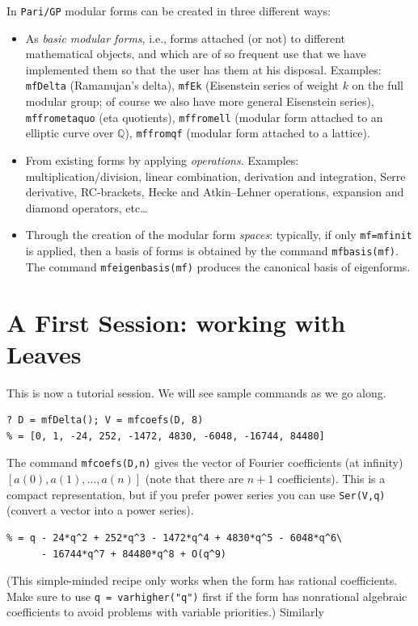 \documentclass[11pt]{article}
\newcommand{\Q}{{\mathbb Q}}
\def\kbd#1{{\tt #1}}
\begin{document}
In \kbd{Pari/GP} modular forms can be created in three different ways:

\begin{itemize}\item As \emph{basic modular forms}, i.e., forms attached (or
  not) to different mathematical objects, and which are of so frequent use
  that we have implemented them so that the user has them at his disposal.
  Examples: \kbd{mfDelta} (Ramanujan's delta), \kbd{mfEk}
  (Eisenstein series of weight $k$ on the full modular group; of course
  we also have more general Eisenstein series), \kbd{mffrometaquo}
  (eta quotients), \kbd{mffromell} (modular form attached to an elliptic
  curve over $\Q$), \kbd{mffromqf} (modular form attached
  to a lattice).
\item From existing forms by applying \emph{operations}.
  Examples: multiplication/division, linear combination,
  derivation and integration, Serre derivative, RC-brackets, Hecke and
  Atkin--Lehner operations, expansion and diamond operators, etc\dots
\item Through the creation of the modular form \emph{spaces}:
  typically, if only \kbd{mf=mfinit} is applied, then a
  basis of forms is obtained by the command \kbd{mfbasis(mf)}.
  The command \kbd{mfeigenbasis(mf)} produces the canonical basis of
  eigenforms.\end{itemize}

\section{A First Session: working with Leaves}

This is now a tutorial session. We will see sample commands as we go along.

\begin{verbatim}
? D = mfDelta(); V = mfcoefs(D, 8)
% = [0, 1, -24, 252, -1472, 4830, -6048, -16744, 84480]
\end{verbatim}

The command \kbd{mfcoefs(D,n)} gives the vector of Fourier coefficients (at
infinity) $[a(0),a(1),\dots,a(n)]$ (note that there are $n+1$ coefficients).
This is a compact representation, but if you prefer power series you
can use \kbd{Ser(V,q)} (convert a vector into a power series).

\begin{verbatim}
% = q - 24*q^2 + 252*q^3 - 1472*q^4 + 4830*q^5 - 6048*q^6\
      - 16744*q^7 + 84480*q^8 + O(q^9)
\end{verbatim}
(This simple-minded recipe only works when the form has rational
coefficients. Make sure to use \kbd{q = varhigher("q")} first if the form has
nonrational algebraic coefficients to avoid problems with variable priorities.)
Similarly
\end{document}
